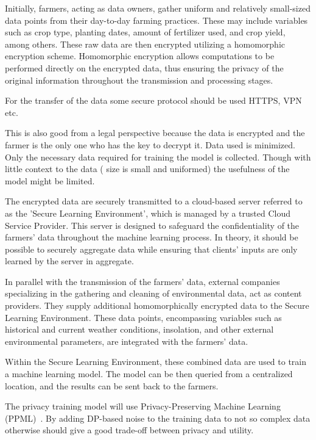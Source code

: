 Initially, farmers, acting as data owners, gather uniform and relatively small-sized data points from their day-to-day farming practices. These may include variables such as crop type, planting dates, amount of fertilizer used, and crop yield, among others. These raw data are then encrypted utilizing a homomorphic encryption scheme. Homomorphic encryption allows computations to be performed directly on the encrypted data, thus ensuring the privacy of the original information throughout the transmission and processing stages.

For the transfer of the data some secure protocol should be used HTTPS, VPN etc.

This is also good from a legal perspective because the data is encrypted and the farmer is the only one who has the key to decrypt it.
Data used is minimized. Only the necessary data required for training the model is collected. Though with little context to the data (
size is small and uniformed) the usefulness of the model might be limited.

The encrypted data are securely transmitted to a cloud-based server referred to as the 'Secure Learning Environment', which is managed by
a trusted Cloud Service Provider. This server is designed to safeguard the confidentiality of the farmers' data throughout the machine
learning process. In theory, it should be possible to securely aggregate
data while ensuring that clients’ inputs are only learned by the
server in aggregate.~\cite[]{bonawitz2017practical}

In parallel with the transmission of the farmers' data, external companies specializing in the gathering and cleaning of environmental data, act as content providers. They supply additional homomorphically encrypted data to the Secure Learning Environment. These data points, encompassing variables such as historical and current weather conditions, insolation, and other external environmental parameters, are integrated with the farmers' data.

Within the Secure Learning Environment, these combined data are used to train a machine learning model. The model can be then queried
from a centralized location, and the results can be sent back to the farmers.

The privacy training model will use Privacy-Preserving Machine Learning (PPML)~\cite[]{SESTAK2021459}. By adding DP-based noise to the
training data to not so complex data otherwise should give a good trade-off between privacy and utility.

